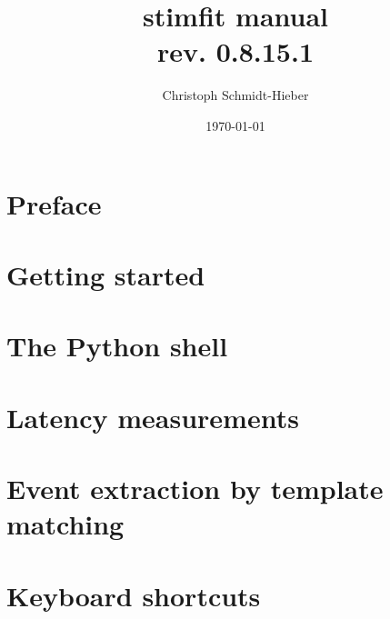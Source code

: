 \documentclass[a4paper,11pt,normalheadings,idxtotoc,bibtotoc,headsepline]{scrbook} %
\title{stimfit manual\\\normalsize rev. 0.8.15.1}
\author{Christoph Schmidt-Hieber}
\date{\today}
\begin{document}
\pagestyle{scrheadings}

\frontmatter

\maketitle

\tableofcontents

\chapter{Preface}



\mainmatter

\chapter{Getting started}



\chapter{The Python shell}



\chapter{Latency measurements}



\chapter{Event extraction by template matching}



\backmatter

\chapter{Keyboard shortcuts}





\footnotesize
\printindex
\normalsize
\end{document}
